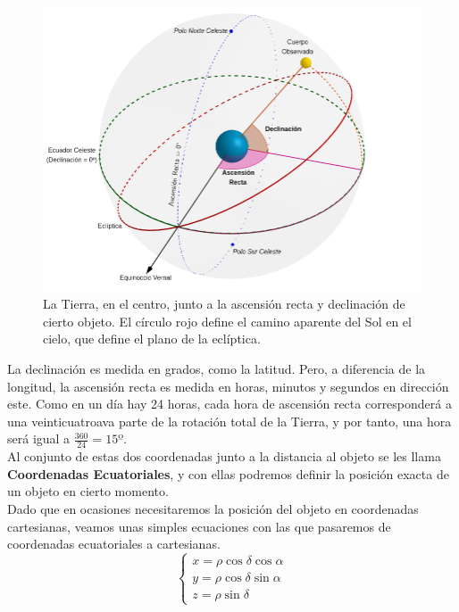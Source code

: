 \documentclass[11pt]{book}
\begin{document}
\begin{figure}[H]
\centering
\includegraphics[scale=0.4]{images/ascension_declinacion.png}
\caption{La Tierra, en el centro, junto a la ascensión recta y declinación de cierto objeto. El círculo rojo define el camino aparente del Sol en el cielo, que define el plano de la eclíptica.}
\label{fig:ascension_declinacion}
\end{figure}

La declinación es medida en grados, como la latitud. Pero, a diferencia de la longitud, la ascensión recta es medida en horas, minutos y segundos en dirección este. Como en un día hay 24 horas, cada hora de ascensión recta corresponderá a una veinticuatroava parte de la rotación total de la Tierra, y por tanto, una hora será igual a $\frac{360}{24}=15º$.\\

Al conjunto de estas dos coordenadas junto a la distancia al objeto se les llama \textbf{Coordenadas Ecuatoriales}, y con ellas podremos definir la posición exacta de un objeto en cierto momento.\\

Dado que en ocasiones necesitaremos la posición del objeto en coordenadas cartesianas, veamos unas simples ecuaciones con las que pasaremos de coordenadas ecuatoriales a cartesianas.
\[
\left\{
\begin{array}{l}
	x = \rho \cos{\delta}\cos{\alpha}\\
	y = \rho \cos{\delta}\sin{\alpha}\\
	z = \rho \sin{\delta}
\end{array}
\right.
\]
\end{document}
